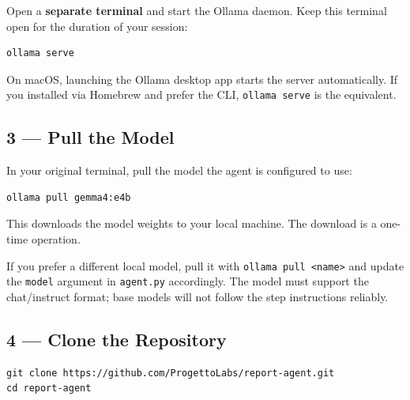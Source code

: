 \documentclass[12pt, a4paper]{article}
\begin{document}
Open a \textbf{separate terminal} and start the Ollama daemon. Keep this terminal open for the duration of your session:

\begin{lstlisting}[style=shellstyle]
ollama serve
\end{lstlisting}

\begin{notebox}
On macOS, launching the Ollama desktop app starts the server automatically. If you installed via Homebrew and prefer the CLI, \texttt{ollama serve} is the equivalent.
\end{notebox}

\subsection{3 — Pull the Model}

In your original terminal, pull the model the agent is configured to use:

\begin{lstlisting}[style=shellstyle]
ollama pull gemma4:e4b
\end{lstlisting}

This downloads the model weights to your local machine. The download is a one-time operation.

\begin{notebox}
If you prefer a different local model, pull it with \texttt{ollama pull <name>} and update the \texttt{model} argument in \texttt{agent.py} accordingly. The model must support the chat/instruct format; base models will not follow the step instructions reliably.
\end{notebox}

\subsection{4 — Clone the Repository}

\begin{lstlisting}[style=shellstyle]
git clone https://github.com/ProgettoLabs/report-agent.git
cd report-agent
\end{lstlisting}

\end{document}
